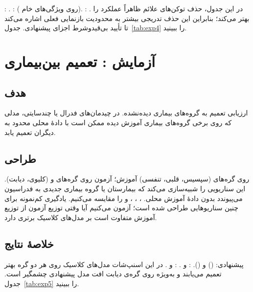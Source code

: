 \texttt{}:  . \texttt{}:  ( روی ویژگی‌های خام). \texttt{}: . در این جدول، حذف توکن‌های علائم ظاهراً عملکرد را بهتر می‌کند؛ بنابراین این حذف تدریجی بیشتر به محدودیت بازنمایی فعلی اشاره می‌کند تا تأیید بی‌قیدوشرط اجزای پیشنهادی. جدول~\ref{tab:exp4} را ببینید.

\section{آزمایش : تعمیم بین‌بیماری}

\subsection{هدف}

ارزیابی تعمیم به گروه‌های بیماری دیده‌نشده. در چیدمان‌های فدرال یا چندسایتی، مدلی که روی برخی گروه‌های بیماری آموزش دیده ممکن است با دادۀ محلی محدود به دیگران تعمیم یابد.

\subsection{طراحی}

روی گره‌های  (سپسیس، قلبی، تنفسی) آموزش؛ آزمون روی گره‌های  و  (کلیوی، دیابت). این سناریویی را شبیه‌سازی می‌کند که بیمارستان یا گروه بیماری جدیدی به فدراسیون می‌پیوندد بدون دادۀ آموزش محلی. \texttt{}، ، ، و  را مقایسه می‌کنیم. یادگیری کم‌نمونه برای چنین سناریوهایی طراحی شده است؛ آزمون می‌کنیم آیا وقتی توزیع آزمون از توزیع آموزش متفاوت است بر مدل‌های کلاسیک برتری دارد.

\subsection{خلاصۀ نتایج}

پیشنهادی:  (\texttt{}) و  (\texttt{}). :  و . :  و . در این اسنپ‌شات مدل‌های کلاسیک روی هر دو گره بهتر تعمیم می‌یابند و به‌ویژه روی گره‌ی دیابت افت مدل پیشنهادی چشمگیر است. جدول~\ref{tab:exp5} را ببینید.

